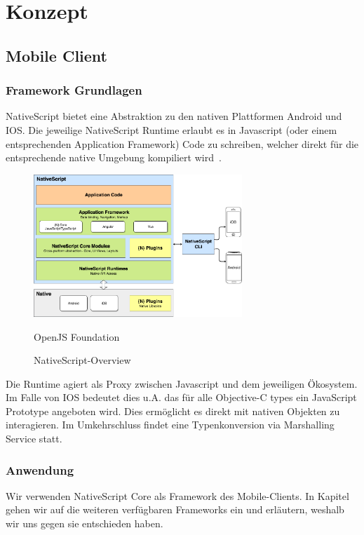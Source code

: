 \section{Konzept}\label{sec:konzept}



\subsection{Mobile Client}\label{subsec:mobile-client}

\subsubsection{Framework Grundlagen}
NativeScript bietet eine Abstraktion zu den nativen Plattformen Android und IOS.
Die jeweilige NativeScript Runtime erlaubt es in Javascript (oder einem entsprechenden Application Framework) Code zu schreiben,
welcher direkt für die entsprechende native Umgebung kompiliert wird~\cite{ns-core-overview}.
\begin{figure}[h]
    \centering
    \label{fig:howNSWorks}
    \includegraphics[width=0.7\textwidth]{graphics/ns-common}\caption[NativeScript-Overview]{NativeScript-Overview}\textcopyright OpenJS Foundation
\end{figure}


Die Runtime agiert als Proxy zwischen Javascript und dem jeweiligen Ökosystem.
Im Falle von IOS bedeutet dies u.A. das für alle Objective-C types ein JavaScript Prototype angeboten wird.
Dies ermöglicht es direkt mit nativen Objekten zu interagieren.
Im Umkehrschluss findet eine Typenkonversion via Marshalling Service statt\cite{ns-ios-runtime}.

\subsubsection{Anwendung}
Wir verwenden NativeScript Core als Framework des Mobile-Clients.
In Kapitel~\emph{} gehen wir auf die weiteren verfügbaren Frameworks ein und erläutern, weshalb wir uns gegen sie entschieden haben.

